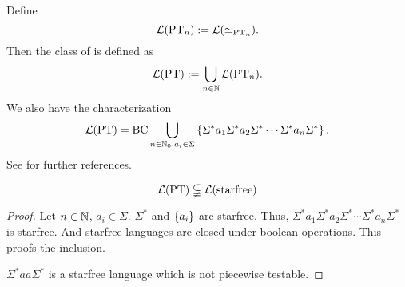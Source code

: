 Define
\[ \mathcal{L}(\textup{\textrm{PT}}_n) := \mathcal{L}(\simeq_{\textup{\textrm{PT}}_n}). \]
Then the class of  is defined as
\[ \mathcal{L}(\textup{\textrm{PT}}) := \bigcup_{n\in\mathbb{N}} \mathcal{L}(\textup{\textrm{PT}}_n) . \]
We also have the characterization
\[ \Lang(\PT) = \BC \bigcup_{n\in\N_0,a_i \in \Sigma} \Set{\Sigma^* a_1 \Sigma^* a_2 \Sigma^* \cdots\Sigma^* a_n \Sigma^*} . \]
See \cite[Section 2.3]{ConcHierR104} for further references.

\begin{lemma}
\[\mathcal{L}(\textup{\textrm{PT}}) \subsetneqq \mathcal{L}(\textup{\textrm{starfree}})\]
\begin{proof}
Let $n\in\mathbb{N}$, $a_i \in \Sigma$. $\Sigma^*$ and $\Set{a_i}$ are starfree. Thus, $\Sigma^* a_1 \Sigma^* a_2 \Sigma^* \cdots\Sigma^* a_n \Sigma^*$ is starfree. And starfree languages are closed under boolean operations. This proofs the inclusion.

$\Sigma^* aa \Sigma^*$ is a starfree language which is not piecewise testable.
\end{proof}
\end{lemma}


